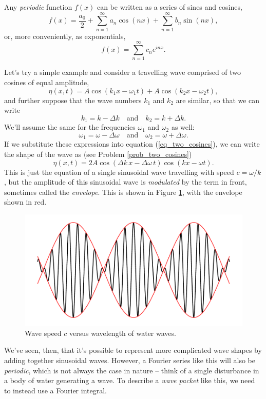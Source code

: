 Any \emph{periodic} function $f(x)$ can be written as a series of sines and cosines,
\[
f(x) = \frac{a_0}{2} + \sum_{n=1}^{\infty} a_n \cos(nx) +  \sum_{n=1}^{\infty} b_n \sin(nx),
\]
or, more conveniently, as exponentials,
\begin{equation}
f(x) = \sum_{n=1}^\infty c_n e^{inx}.
\end{equation}

Let's try a simple example and consider a travelling wave comprised of two cosines of equal amplitude,
\begin{equation}
\label{eq_two_cosines}
\eta(x, t) = A \cos(k_1 x - \omega_1 t) + A \cos(k_2 x - \omega_2 t),
\end{equation}
and further suppose that the wave numbers $k_1$ and $k_2$ are similar, so that we can write
\[
k_1 = k - \Delta k \quad \text{and} \quad k_2 = k + \Delta k.
\]
We'll assume the same for the frequencies $\omega_1$ and $\omega_2$ as well:
\[
\omega_1 = \omega - \Delta \omega \quad \text{and} \quad \omega_2 = \omega + \Delta \omega.
\]
If we substitute these expressions into equation (\ref{eq_two_cosines}), we can write the shape of the wave as (see Problem \ref{prob_two_cosines})
\begin{equation}
\eta(x, t) = 2A \cos(\Delta k \, x - \Delta \omega \, t) \cos(kx - \omega t).
\end{equation}
This is just the equation of a single sinusoidal wave travelling with speed $c = \omega/k$, but the amplitude of this sinusoidal wave is \emph{modulated} by the term in front, sometimes called the \emph{envelope}.  This is shown in Figure \ref{fig_two_cosines}, with the envelope shown in red.

\begin{figure}
\centering\includegraphics[width=0.8\linewidth]{Figures/Chapter5/fig_two_cosines}
\caption{Wave speed $c$ versus wavelength of water waves.}
\label{fig_two_cosines}
\end{figure}

We've seen, then, that it's possible to represent more complicated wave shapes by adding together sinusoidal waves.  However, a Fourier series like this will also be \emph{periodic}, which is not always the case in nature -- think of a single disturbance in a body of water generating a wave.  To describe a \emph{wave packet} like this, we need to instead use a Fourier integral.

